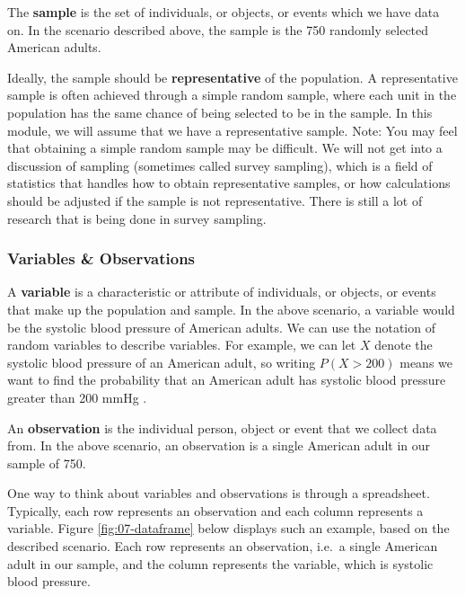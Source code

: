 \documentclass[
]{book}
\begin{document}
The \textbf{sample} is the set of individuals, or objects, or events which we have data on. In the scenario described above, the sample is the 750 randomly selected American adults.

Ideally, the sample should be \textbf{representative} of the population. A representative sample is often achieved through a simple random sample, where each unit in the population has the same chance of being selected to be in the sample. In this module, we will assume that we have a representative sample. Note: You may feel that obtaining a simple random sample may be difficult. We will not get into a discussion of sampling (sometimes called survey sampling), which is a field of statistics that handles how to obtain representative samples, or how calculations should be adjusted if the sample is not representative. There is still a lot of research that is being done in survey sampling.

\subsubsection{Variables \& Observations}\label{variables-observations}

A \textbf{variable} is a characteristic or attribute of individuals, or objects, or events that make up the population and sample. In the above scenario, a variable would be the systolic blood pressure of American adults. We can use the notation of random variables to describe variables. For example, we can let \(X\) denote the systolic blood pressure of an American adult, so writing \(P(X>200)\) means we want to find the probability that an American adult has systolic blood pressure greater than 200 mmHg .

An \textbf{observation} is the individual person, object or event that we collect data from. In the above scenario, an observation is a single American adult in our sample of 750.

One way to think about variables and observations is through a spreadsheet. Typically, each row represents an observation and each column represents a variable. Figure \ref{fig:07-dataframe} below displays such an example, based on the described scenario. Each row represents an observation, i.e.~a single American adult in our sample, and the column represents the variable, which is systolic blood pressure.
\end{document}
